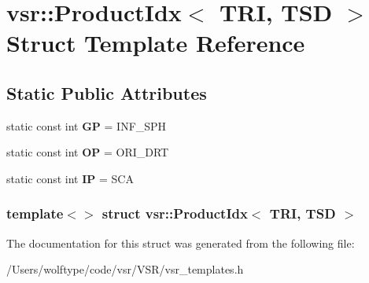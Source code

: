\hypertarget{structvsr_1_1_product_idx_3_01_t_r_i_00_01_t_s_d_01_4}{\section{vsr\-:\-:Product\-Idx$<$ T\-R\-I, T\-S\-D $>$ Struct Template Reference}
\label{structvsr_1_1_product_idx_3_01_t_r_i_00_01_t_s_d_01_4}
}
\subsection*{Static Public Attributes}
\begin{DoxyCompactItemize}
\item 
\hypertarget{structvsr_1_1_product_idx_3_01_t_r_i_00_01_t_s_d_01_4_ab6afd313b0fd0b3f96ae63132dc0d0ce}{static const int {\bfseries G\-P} = I\-N\-F\-\_\-\-S\-P\-H}\label{structvsr_1_1_product_idx_3_01_t_r_i_00_01_t_s_d_01_4_ab6afd313b0fd0b3f96ae63132dc0d0ce}

\item 
\hypertarget{structvsr_1_1_product_idx_3_01_t_r_i_00_01_t_s_d_01_4_a3099308064359cba2a62805de9a069a1}{static const int {\bfseries O\-P} = O\-R\-I\-\_\-\-D\-R\-T}\label{structvsr_1_1_product_idx_3_01_t_r_i_00_01_t_s_d_01_4_a3099308064359cba2a62805de9a069a1}

\item 
\hypertarget{structvsr_1_1_product_idx_3_01_t_r_i_00_01_t_s_d_01_4_a6724dd42741cfdab05151c754a4d284e}{static const int {\bfseries I\-P} = S\-C\-A}\label{structvsr_1_1_product_idx_3_01_t_r_i_00_01_t_s_d_01_4_a6724dd42741cfdab05151c754a4d284e}

\end{DoxyCompactItemize}
\subsubsection*{template$<$$>$ struct vsr\-::\-Product\-Idx$<$ T\-R\-I, T\-S\-D $>$}



The documentation for this struct was generated from the following file\-:\begin{DoxyCompactItemize}
\item 
/\-Users/wolftype/code/vsr/\-V\-S\-R/vsr\-\_\-templates.\-h\end{DoxyCompactItemize}
